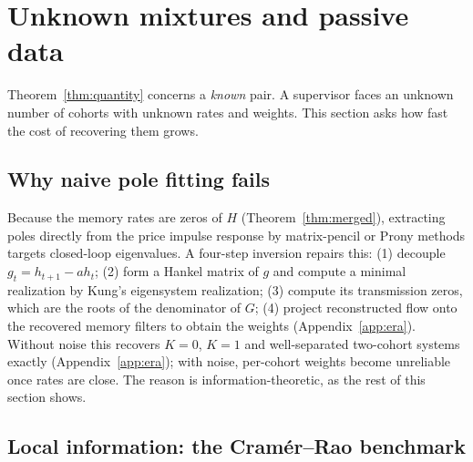 \section{Unknown mixtures and passive data}\label{sec:mixtures}

Theorem~\ref{thm:quantity} concerns a \emph{known} pair. A supervisor faces an unknown number of cohorts with unknown rates and weights. This section asks how fast the cost of recovering them grows.

\subsection{Why naive pole fitting fails}

Because the memory rates are zeros of $H$ (Theorem~\ref{thm:merged}), extracting poles directly from the price impulse response by matrix-pencil or Prony methods targets closed-loop eigenvalues. A four-step inversion repairs this: (1) decouple $g_t=h_{t+1}-ah_t$; (2) form a Hankel matrix of $g$ and compute a minimal realization by Kung's eigensystem realization; (3) compute its transmission zeros, which are the roots of the denominator of $G$; (4) project reconstructed flow onto the recovered memory filters to obtain the weights (Appendix~\ref{app:era}). Without noise this recovers $K=0$, $K=1$ and well-separated two-cohort systems exactly (Appendix~\ref{app:era}); with noise, per-cohort weights become unreliable once rates are close. The reason is information-theoretic, as the rest of this section shows.

\subsection{Local information: the Cram\'er--Rao benchmark}

